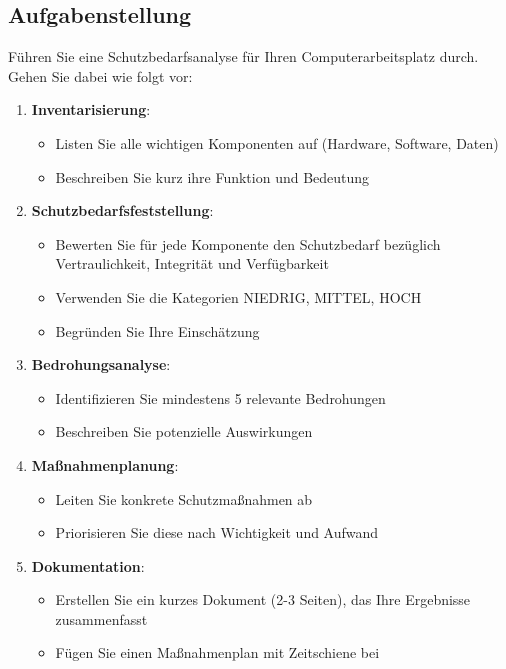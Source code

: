 \documentclass{orgstandard}
\begin{document}
\subsection{Aufgabenstellung}
\label{sec:orgf593a16}

Führen Sie eine Schutzbedarfsanalyse für Ihren Computerarbeitsplatz durch. Gehen Sie dabei wie folgt vor:

\begin{enumerate}
\item \textbf{Inventarisierung}:
\begin{itemize}
\item Listen Sie alle wichtigen Komponenten auf (Hardware, Software, Daten)
\item Beschreiben Sie kurz ihre Funktion und Bedeutung
\end{itemize}

\item \textbf{Schutzbedarfsfeststellung}:
\begin{itemize}
\item Bewerten Sie für jede Komponente den Schutzbedarf bezüglich Vertraulichkeit, Integrität und Verfügbarkeit
\item Verwenden Sie die Kategorien NIEDRIG, MITTEL, HOCH
\item Begründen Sie Ihre Einschätzung
\end{itemize}

\item \textbf{Bedrohungsanalyse}:
\begin{itemize}
\item Identifizieren Sie mindestens 5 relevante Bedrohungen
\item Beschreiben Sie potenzielle Auswirkungen
\end{itemize}

\item \textbf{Maßnahmenplanung}:
\begin{itemize}
\item Leiten Sie konkrete Schutzmaßnahmen ab
\item Priorisieren Sie diese nach Wichtigkeit und Aufwand
\end{itemize}

\item \textbf{Dokumentation}:
\begin{itemize}
\item Erstellen Sie ein kurzes Dokument (2-3 Seiten), das Ihre Ergebnisse zusammenfasst
\item Fügen Sie einen Maßnahmenplan mit Zeitschiene bei
\end{itemize}
\end{enumerate}
\end{document}
